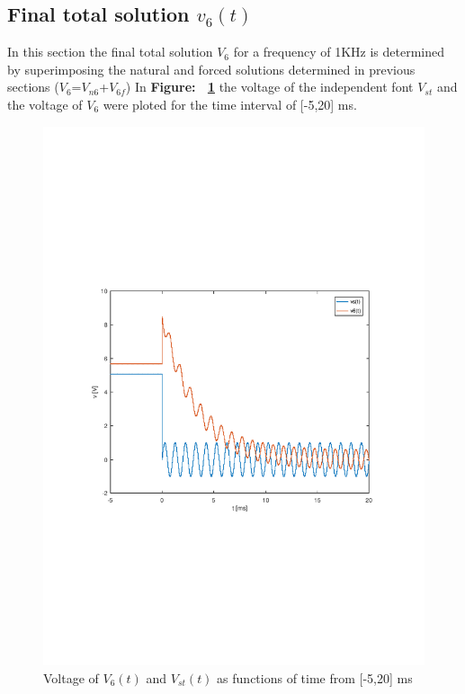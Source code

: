 \pagebreak
\subsection{Final total solution $v_6(t)$}
In this section the final total solution $V_6$ for a frequency of 1KHz is determined by superimposing the natural and forced solutions determined in previous sections ($V_6$=$V_{n6}$+$V_{6f}$) In \textbf{Figure: ~\ref{fig:theo5}} the voltage of the independent font $V_{st}$ and the voltage of $V_{6}$ were ploted for the time interval of [-5,20] ms. 
\begin{figure}[h!] \centering
\includegraphics[width=0.9\linewidth]{theo5_tab.pdf}
\caption{Voltage of $V_{6}(t)$ and $V_{st}(t)$ as functions of time from [-5,20] ms}
\label{fig:theo5}
\end{figure}
\vspace{15cm}


\pagebreak

